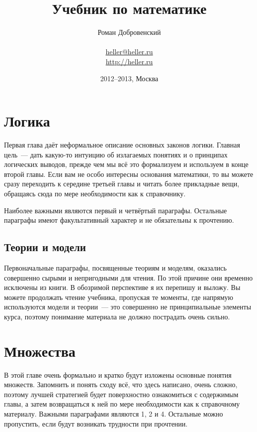 \documentclass[a5paper,10pt,pagesize,DIV=classic]{scrbook}
\theoremstyle{plain}
\theoremstyle{definition}
\begin{document}
\title{Учебник по математике}
\author{Роман Добровенский\\ \\ \url{heller@heller.ru}\\ \url{http://heller.ru}}
\date{2012--2013, Москва}
\maketitle

\tableofcontents



\chapter{Логика}
Первая глава даёт неформальное описание основных законов логики. Главная цель~--- дать какую-то интуицию об излагаемых понятиях и о принципах логических выводов, прежде чем мы всё это формализуем и используем в конце второй главы. Если вам не особо интересны основания математики, то вы можете сразу переходить к середине третьей главы и читать более прикладные вещи, обращаясь сюда по мере необходимости как к справочнику.

Наиболее важными являются первый и четвёртый параграфы. Остальные параграфы имеют факультативный характер и не обязательны к прочтению.







\section{Теории и модели}
Первоначальные параграфы, посвященные теориям и моделям, оказались совершенно сырыми и непригодными для чтения. По этой причине они временно исключены из книги. В обозримой перспективе я их перепишу и выложу. Вы можете продолжать чтение учебника, пропуская те моменты, где напрямую используются модели и теории~--- это совершенно не принципиальные элементы курса, поэтому понимание материала не должно пострадать очень сильно.





\chapter{Множества}
В этой главе очень формально и кратко будут изложены основные понятия множеств. Запомнить и понять сходу всё, что здесь написано, очень сложно, поэтому лучшей стратегией будет поверхностно ознакомиться с содержимым главы, а затем возвращаться к ней по мере необходимости как к справочному материалу. Важными параграфами являются 1, 2 и 4. Остальные можно пропустить, если будут возникать трудности при прочтении.
\end{document}
